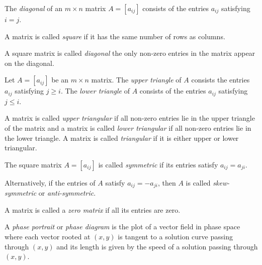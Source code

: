 \begin{SaveDefinition}[key=Diagonal, title={Diagonal}]
	The \emph{diagonal} of an $m\times n$ matrix $A=[a_{ij}]$ consists of
	the entries $a_{ij}$ satisfying $i=j$.
\end{SaveDefinition}
\begin{SaveDefinition}[key=SquareMatrix, title={Square Matrix}]
	A matrix is called \emph{square} if it has the same
	number of rows as columns.
\end{SaveDefinition}
\begin{SaveDefinition}[key=DiagonalMatrix, title={Diagonal Matrix}]
	A square matrix is called \emph{diagonal} the only non-zero
	entries in the matrix appear on the diagonal.
\end{SaveDefinition}
\begin{SaveDefinition}[key=TriangleOf, title={Upper \& Lower Triangle}]
	Let $A=[a_{ij}]$ be an $m\times n$ matrix. The \emph{upper triangle}
	of $A$ consists the entries $a_{ij}$
	satisfying $j\geq i$. The \emph{lower triangle}
	of $A$ consists of the entries $a_{ij}$ satisfying $j\leq i$.
\end{SaveDefinition}
\begin{SaveDefinition}[key=TriangularMatrix, title={Triangular Matrices}]
	A matrix is called \emph{upper triangular} if all non-zero entries lie in the upper triangle of the matrix and
	a matrix is called \emph{lower triangular} if all non-zero entries lie in the lower triangle. A matrix is
	called \emph{triangular} if it is either upper or lower triangular.
\end{SaveDefinition}
\begin{SaveDefinition}[key=SymmetricMatrix, title={Symmetric Matrix}]
	The square matrix $A=[a_{ij}]$ is called \emph{symmetric} if its
	entries satisfy $a_{ij}=a_{ji}$.

	Alternatively, if the entries of $A$ satisfy $a_{ij}=-a_{ji}$, then $A$
	is called \emph{skew-symmetric} or \emph{anti-symmetric}.
\end{SaveDefinition}
\begin{SaveDefinition}[key=ZeroMatrix, title={Zero Matrix}]
	A matrix is called a \emph{zero matrix} if all its entries are zero.
\end{SaveDefinition}
\begin{SaveDefinition}[key=PhasePortrait, title={Phase Portrait}]
		A \emph{phase portrait} or \emph{phase diagram} is the plot of a vector field in phase space
		where each vector rooted at $(x,y)$ is tangent to a solution curve passing through $(x,y)$
		and its length is given by the speed of a solution passing through $(x,y)$.
\end{SaveDefinition}



